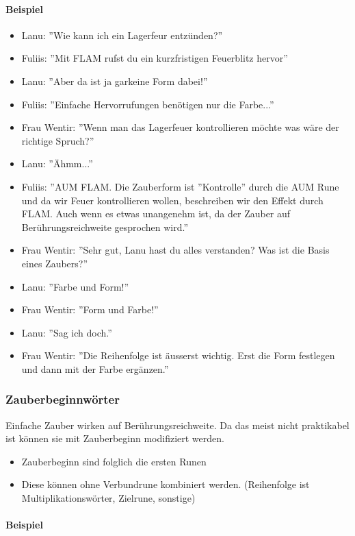 \documentclass{article}
\begin{document}
\paragraph{Beispiel}

\begin{itemize}
\item Lanu: ''Wie kann ich ein Lagerfeur entzünden?''
\item Fuliis: ''Mit FLAM rufst du ein kurzfristigen Feuerblitz hervor''
\item Lanu: ''Aber da ist ja garkeine Form dabei!''
\item Fuliis: ''Einfache Hervorrufungen benötigen nur die Farbe...''
\item Frau Wentir: ''Wenn man das Lagerfeuer kontrollieren möchte was wäre der richtige Spruch?''
\item Lanu: ''Ähmm...''
\item Fuliis: ''AUM FLAM. Die Zauberform ist ''Kontrolle'' durch die AUM Rune und da wir Feuer kontrollieren wollen, beschreiben wir den Effekt durch FLAM. Auch wenn es etwas unangenehm ist, da der Zauber auf Berührungsreichweite gesprochen wird.''
\item Frau Wentir: ''Sehr gut, Lanu hast du alles verstanden? Was ist die Basis eines Zaubers?''
\item Lanu: ''Farbe und Form!''
\item Frau Wentir: ''Form und Farbe!''
\item Lanu: ''Sag ich doch.''
\item Frau Wentir: ''Die Reihenfolge ist äusserst wichtig. Erst die Form festlegen und dann mit der Farbe ergänzen.''
\end{itemize}

\subsubsection{Zauberbeginnwörter}

Einfache Zauber wirken auf Berührungsreichweite. Da das meist nicht praktikabel ist können sie mit Zauberbeginn
modifiziert werden.

\begin{itemize}
\item Zauberbeginn sind folglich die ersten Runen
\item Diese können ohne Verbundrune kombiniert werden. (Reihenfolge ist Multiplikationswörter, Zielrune, sonstige)
\end{itemize}

\paragraph{Beispiel}
\end{document}
